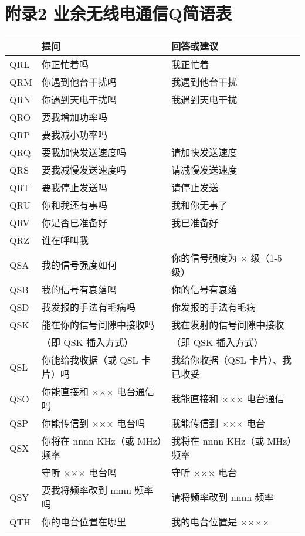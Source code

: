 \newpage

\section*{附录2 业余无线电通信Q简语表}

\begin{tabular}{|l|l|l|}
	\hline
	    & \textbf{提问} & \textbf{回答或建议} \\
	\hline
	QRL & 你正忙着吗 & 我正忙着 \\
	\hline
	QRM & 你遇到他台干扰吗 & 我遇到他台干扰 \\
	\hline
	QRN & 你遇到天电干扰吗 & 我遇到天电干扰 \\
	\hline
	QRO & 要我增加功率吗 & \\
	\hline
	QRP & 要我减小功率吗 & \\
	\hline
	QRQ & 要我加快发送速度吗 & 请加快发送速度 \\
	\hline
	QRS & 要我减慢发送速度吗 & 请减慢发送速度 \\
	\hline
	QRT & 要我停止发送吗 & 请停止发送 \\
	\hline
	QRU & 你和我还有事吗 & 我和你无事了 \\
	\hline
	QRV & 你是否已准备好 & 我已准备好 \\
	\hline
	QRZ & 谁在呼叫我 & \\
	\hline
	QSA & 我的信号强度如何 & 你的信号强度为 × 级（1-5 级） \\
	\hline
	QSB & 我的信号有衰落吗 & 你的信号有衰落 \\
	\hline
	QSD & 我发报的手法有毛病吗 & 你发报的手法有毛病 \\
	\hline
	QSK & 能在你的信号间隙中接收吗 & 我在发射的信号间隙中接收 \\
	& （即 QSK 插入方式）    & （即 QSK 插入方式） \\
	\hline
	QSL & 你能给我收据（或 QSL 卡片）吗 & 我给你收据（QSL 卡片）、我已收妥 \\
	\hline
	QSO & 你能直接和 ××× 电台通信吗 & 我能直接和 ××× 电台通信 \\
	\hline
	QSP & 你能传信到 ××× 电台吗 & 我能传信到 ××× 电台 \\
	\hline
	QSX & 你将在 nnnn KHz（或 MHz）频率 & 我将在 nnnn KHz（或 MHz）频率 \\
	    & 守听 ××× 电台吗 & 守听 ××× 电台 \\
	\hline
	QSY & 要我将频率改到 nnnn 频率吗 & 请将频率改到 nnnn 频率 \\
	\hline
	QTH & 你的电台位置在哪里 & 我的电台位置是 ×××× \\
	\hline
\end{tabular}

